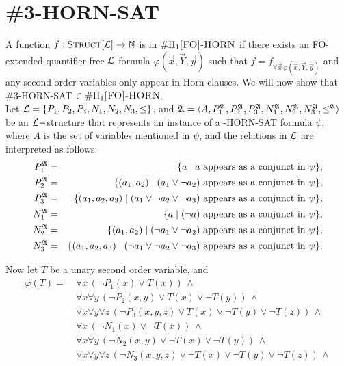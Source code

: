 \documentclass[12pt]{article}
\def\Etwo{\#\Pi_1\textsc{[FO]-HORN}}
\def\Truc{\textsc{Struct}[\L]}
\def\A{{\frak A}}
\def\L{{\cal L}}
\def\N{\mathbb{N}}
\def\Y{\vec{Y}}
\def\x{\vec{x}} %
\def\y{\vec{y}} %
\begin{document}
\section{{\sc \#3-HORN-SAT}}
A function $f:\Truc \to \N$ is in $\Etwo$ if there exists an {\sc FO}-extended quantifier-free $\L$-formula $\varphi(\x,\Y,\y)$ such that $f = f_{\forall \x\,\varphi(\x,\Y,\y)}$ and any second order variables only appear in Horn clauses. We will now show that {\sc \#3-HORN-SAT} $\in\Etwo$.\\

Let $\L = \{P_1,P_2,P_3,N_1,N_2,N_3,\leq\}$, and $\A = \langle A, P_1^\A,P_2^\A,P_3^\A,N_1^\A,N_2^\A,N_3^\A, \leq^\A \rangle$ be an $\L-$structure that represents an instance of a {-HORN-SAT} formula $\psi$, where $A$ is the set of variables mentioned in $\psi$, and the relations in $\L$ are interpreted as follows:
\begin{eqnarray*}
P_1^\A &=& \{a\mid a \mbox{ appears as a conjunct in }\psi\},\\
P_2^\A &=& \{(a_1,a_2)\mid (a_1\vee \neg a_2) \mbox{ appears as a conjunct in }\psi\},\\
P_3^\A &=& \{(a_1,a_2,a_3)\mid (a_1\vee \neg a_2\vee \neg a_3) \mbox{ appears as a conjunct in }\psi\},\\
N_1^\A &=& \{a\mid (\neg a) \mbox{ appears as a conjunct in }\psi\},\\
N_2^\A &=& \{(a_1,a_2)\mid (\neg a_1\vee \neg a_2) \mbox{ appears as a conjunct in }\psi\},\\
N_3^\A &=& \{(a_1,a_2,a_3)\mid (\neg a_1\vee \neg a_2\vee \neg a_3) \mbox{ appears as a conjunct in }\psi\}.
\end{eqnarray*}

Now let $T$ be a unary second order variable, and
\begin{align*}
\varphi(T) =\ &\forall x\, (\neg P_1(x) \vee T(x))\,\wedge\\
&\forall x\forall y\, (\neg P_2(x,y) \vee T(x) \vee \neg T(y))\,\wedge\\
&\forall x\forall y\forall z\, (\neg P_3(x,y,z) \vee T(x) \vee \neg T(y) \vee \neg T(z))\,\wedge\\
&\forall x\, (\neg N_1(x) \vee \neg T(x))\,\wedge\\
&\forall x\forall y\, (\neg N_2(x,y) \vee \neg T(x) \vee \neg T(y))\,\wedge\\
&\forall x\forall y\forall z\, (\neg N_3(x,y,z) \vee \neg T(x) \vee \neg T(y) \vee \neg T(z))\,\wedge
\end{align*}
\end{document}
